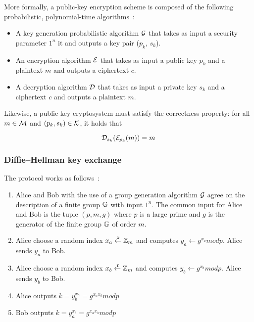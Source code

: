 More formally, a public-key encryption scheme is composed of the following probabilistic, polynomial-time algorithms~\cite{Katz:2014:IMC:2700550, kiagias:crypto}:

\begin{itemize}
  \item A key generation probabilistic algorithm $\mathcal{G}$ that takes as input a security parameter $1^{n}$ it and outputs a key pair ($p_k$, $s_k$).
  \item An encryption algorithm $\mathcal{E}$ that takes as input a public key $p_k$ and a plaintext $m$ and outputs a ciphertext $c$.
  \item A decryption algorithm $\mathcal{D}$ that takes as input a private key $s_k$ and a ciphertext $c$ and outputs a plaintext $m$.
\end{itemize}

Likewise, a public-key cryptosystem must satisfy the correctness property: for all $m \in \mathcal{M}$ and $(p_k, s_k) \in \mathcal{K}$, it holds that

\begin{equation*}
  \mathcal{D}_{s_k}(\mathcal{E}_{p_k}(m)) = m
\end{equation*}

\subsubsection{Diffie–Hellman key exchange}
\label{preliminaries:crypto_block:pub:dh}

The protocol works as follows~\cite{Katz:2014:IMC:2700550, kiagias:crypto}:

\begin{enumerate}
  \item Alice and Bob  with the use of a group generation algorithm $\mathcal{G}$ agree on the description of a finite group $\mathbb{G}$ with input $1^{n}$. The common input for Alice and Bob is the tuple $(p, m, g)$ where $p$ is a large prime and $g$ is the generator of the finite group $\mathbb{G}$ of order $m$.
  \item Alice choose a random index $x_a \xleftarrow{\mathtt{r}}{\mathbb{Z}_m}$ and computes $y_a \leftarrow{g^{x_a}}modp$. Alice sends $y_a$ to Bob.
  \item Alice choose a random index $x_b \xleftarrow{\mathtt{r}}{\mathbb{Z}_m}$ and computes $y_b \leftarrow{g^{x_b}}modp$. Alice sends $y_b$ to Bob.
  \item Alice outputs $k = y_b^{x_a} = g^{{x_a}{x_b}}modp$
  \item Bob outputs $k = y_a^{x_b} = g^{{x_a}{x_b}}modp$
\end{enumerate}

